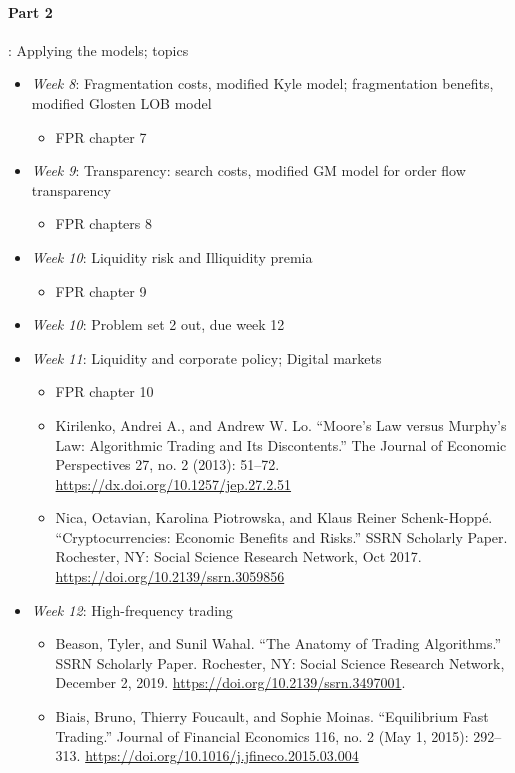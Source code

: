 \documentclass{article}
\begin{document}
\medskip
\paragraph{Part 2}: Applying the models; topics
\begin{itemize}
	\item \textit{Week 8}: Fragmentation costs, {modified Kyle model}; fragmentation benefits, {modified Glosten LOB model}
	\begin{itemize}
		\item FPR chapter 7
	\end{itemize}
	\item \textit{Week 9}: Transparency: search costs, {modified GM model} for order flow transparency
	\begin{itemize}
		\item FPR chapters 8
	\end{itemize}
	\item \textit{Week 10}: Liquidity risk and Illiquidity premia
	\begin{itemize}
		\item FPR chapter 9
	\end{itemize}
	\item \textit{Week 10}: Problem set 2 out, due week 12
	\item \textit{Week 11}: Liquidity and corporate policy; Digital markets
	\begin{itemize}
		\item FPR chapter 10
		\item Kirilenko, Andrei A., and Andrew W. Lo. “Moore’s Law versus Murphy’s Law: Algorithmic Trading and Its Discontents.” The Journal of Economic Perspectives 27, no. 2 (2013): 51–72. \url{https://dx.doi.org/10.1257/jep.27.2.51}
		\item Nica, Octavian, Karolina Piotrowska, and Klaus Reiner Schenk-Hoppé. “Cryptocurrencies: Economic Benefits and Risks.” SSRN Scholarly Paper. Rochester, NY: Social Science Research Network, Oct 2017. \url{https://doi.org/10.2139/ssrn.3059856}
	\end{itemize}
	\item \textit{Week 12}: High-frequency trading
	\begin{itemize}
		\item Beason, Tyler, and Sunil Wahal. “The Anatomy of Trading Algorithms.” SSRN Scholarly Paper. Rochester, NY: Social Science Research Network, December 2, 2019. \url{https://doi.org/10.2139/ssrn.3497001}.
		\item Biais, Bruno, Thierry Foucault, and Sophie Moinas. “Equilibrium Fast Trading.” Journal of Financial Economics 116, no. 2 (May 1, 2015): 292–313. \url{https://doi.org/10.1016/j.jfineco.2015.03.004}

\end{itemize}
\end{itemize}
\end{document}
